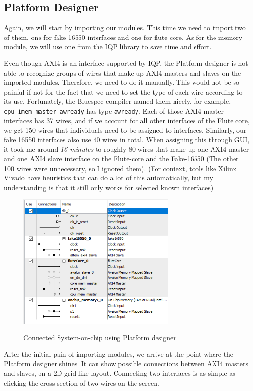 \documentclass[12pt]{report}
\begin{document}
\subsection{Platform Designer} 
Again, we will start by importing our modules.  
This time we need to import two of them, one for fake 16550 interfaces and one for flute core.  
As for the memory module, we will use one from the IQP library to save time and effort. 
\par 
Even though AXI4 is an interface supported by IQP, the Platform designer is not able to recognize groups of wires that make up AXI4 masters and slaves on the imported modules. 
Therefore, we need to do it manually. This would not be so painful if not for the fact that we need to set the type of each wire according to its use. Fortunately, the Bluespec compiler named them nicely, for example, \verb!cpu_imem_master_awready! has type \verb!awready!. Each of those AXI4 master interfaces has 37 wires, and if we account for all other interfaces of the Flute core, we get 150 wires that individuals need to be assigned to interfaces. Similarly, our fake 16550 interfaces also use 40 wires in total. When assigning this through GUI, it took me around \emph{16 minutes} to roughly 80 wires that make up one AXI4 master and one AXI4 slave interface on the Flute-core and the Fake-16550 (The other 100 wires were unnecessary, so I ignored them). (For context, tools like Xilinx Vivado have heuristics that can do a lot of this automatically, but my understanding is that it still only works for selected known interfaces) 
\\ 
\begin{figure}[H] 
   \caption{Connected System-on-chip using Platform designer} 
   \includegraphics[width=0.7\textwidth]{images/Example2QSys.png} \\ 
   \centering 
\end{figure} 
After the initial pain of importing modules, we arrive at the point where the Platform designer shines. It can show possible connections between AXI4 masters and slaves, on a 2D-grid-like layout. Connecting two interfaces is as simple as clicking the cross-section of two wires on the screen.  
\end{document}
